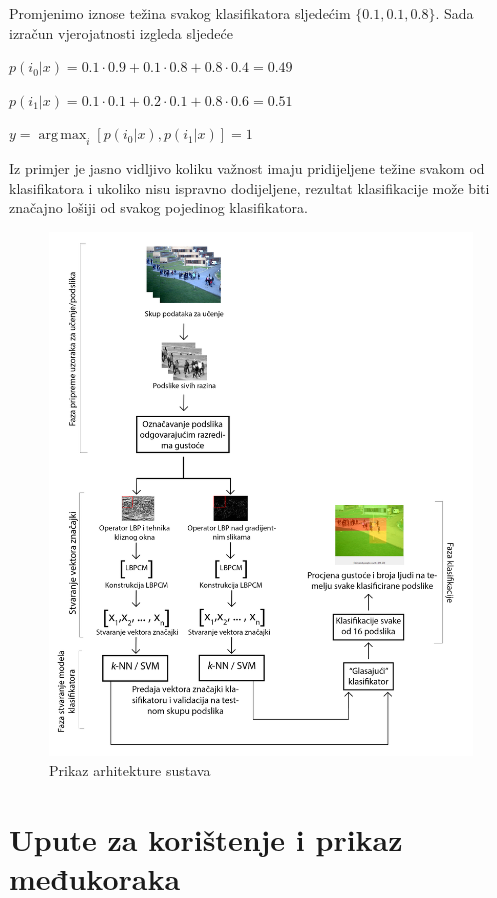 \documentclass[times, utf8, zavrsni]{fer}
\DeclareMathOperator*{\argmax}{arg\,max}
\begin{document}
Promjenimo iznose težina svakog klasifikatora sljedećim \(\{0.1,0.1,0.8\}\). Sada izračun
vjerojatnosti izgleda sljedeće

\begin{center}
\(p(i_0|x) = 0.1 \cdot 0.9 + 0.1 \cdot 0.8 + 0.8 \cdot 0.4 = 0.49\)

\(p(i_1|x) = 0.1 \cdot 0.1 + 0.2 \cdot 0.1 + 0.8 \cdot 0.6 = 0.51\)

\(y=\argmax_i [p(i_0|x),p(i_1|x)]=1\)
\end{center}

Iz primjer je jasno vidljivo koliku važnost imaju pridijeljene težine svakom od
klasifikatora i ukoliko nisu ispravno dodijeljene, rezultat klasifikacije može
biti značajno lošiji od svakog pojedinog klasifikatora.

\begin{figure}[ht]
\centering
\includegraphics[scale=0.18]{img/somprobajzbrisati.png}
\caption{Prikaz arhitekture sustava}
\end{figure}

\chapter{Upute za korištenje i prikaz međukoraka}
\end{document}
